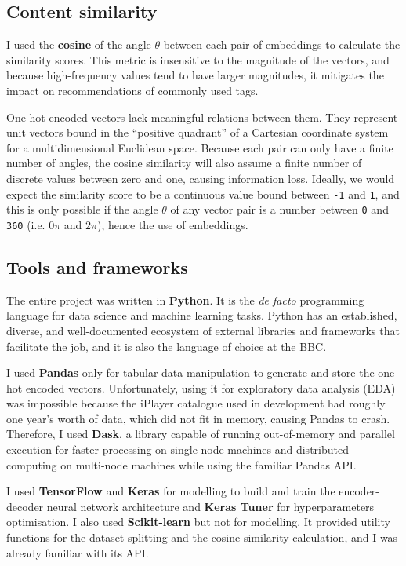 \subsection{Content similarity}

I used the \textbf{cosine} of the angle $\theta$ between each pair of embeddings to calculate the similarity scores.
This metric is insensitive to the magnitude of the vectors, and because high-frequency values tend to have larger magnitudes,
it mitigates the impact on recommendations of commonly used tags.

One-hot encoded vectors lack meaningful relations between them.
They represent unit vectors bound in the ``positive quadrant'' of a Cartesian coordinate system for a multidimensional Euclidean space.
Because each pair can only have a finite number of angles,
the cosine similarity will also assume a finite number of discrete values between zero and one, causing information loss.
Ideally, we would expect the similarity score to be a continuous value bound between \verb|-1| and \verb|1|,
and this is only possible if the angle $\theta$ of any vector pair is a number between \verb|0| and \verb|360|
(i.e. $0\pi$ and $2\pi$), hence the use of embeddings.

\subsection{Tools and frameworks}

The entire project was written in \textbf{Python}.
It is the \textit{de facto} programming language for data science and machine learning tasks.
Python has an established, diverse, and well-documented ecosystem of external libraries and frameworks that facilitate the job,
and it is also the language of choice at the BBC.

I used \textbf{Pandas} only for tabular data manipulation to generate and store the one-hot encoded vectors.
Unfortunately, using it for exploratory data analysis (EDA) was impossible
because the iPlayer catalogue used in development had roughly one year's worth of data,
which did not fit in memory, causing Pandas to crash.
Therefore, I used \textbf{Dask}, a library capable of running out-of-memory and parallel execution for faster processing
on single-node machines and distributed computing on multi-node machines while using the familiar Pandas API.

I used \textbf{TensorFlow} and \textbf{Keras} for modelling to build and train the encoder-decoder neural network architecture
and \textbf{Keras Tuner} for hyperparameters optimisation. I also used \textbf{Scikit-learn} but not for modelling.
It provided utility functions for the dataset splitting and the cosine similarity calculation,
and I was already familiar with its API.

